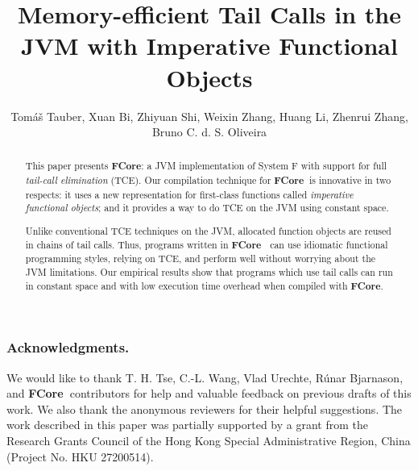 \documentclass{llncs}
\newcommand{\name}{{\bf FCore~}}
\newcommand{\Name}{{\bf FCore}}
\begin{document}
\lstset{keywordstyle=\textbf,language=Java}

\title{Memory-efficient Tail Calls in the JVM with Imperative Functional Objects}

\author{Tom\'{a}\v{s} Tauber, Xuan Bi, Zhiyuan Shi,
Weixin Zhang, Huang Li, Zhenrui Zhang, Bruno C. d. S. Oliveira}
%
%

\maketitle

\begin{abstract}

This paper presents \Name: a JVM implementation of System F
with support for full \emph{tail-call elimination} (TCE). 
Our compilation technique for \name is innovative in two respects: it
uses a new representation for first-class functions called
\emph{imperative functional objects}; and it provides a way
to do TCE on the JVM using constant space.

Unlike conventional TCE techniques on the JVM, allocated function objects
are reused in chains of tail calls.
Thus, programs written in \name
can use idiomatic functional programming styles, relying
on TCE, and perform well without worrying about
the JVM limitations. Our empirical results show that programs which use tail calls
can run in constant space and with low execution time overhead when compiled with \Name.

\end{abstract}















\subsubsection*{Acknowledgments.}
We would like to thank T. H. Tse, C.-L. Wang, Vlad Urechte, R\'{u}nar Bjarnason, and \name contributors for help and valuable feedback on previous drafts of this work. We also thank the anonymous reviewers for their helpful suggestions. The work described in this paper was partially supported by a grant from the Research Grants Council of the Hong Kong Special Administrative Region, China (Project No. HKU 27200514).



\end{document}
